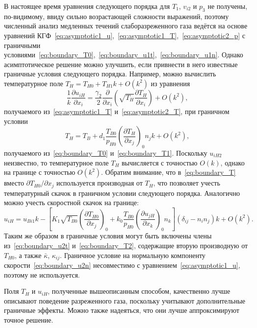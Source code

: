 \documentclass[
aps,%
12pt,%
final,%
notitlepage,%
oneside,%
onecolumn,%
nobibnotes,%
nofootinbib,%
superscriptaddress,%
noshowpacs,%
showkeys,%
centertags]%
{revtex4}
\newcommand{\pder}[2][]{\frac{\partial#1}{\partial#2}}
\newcommand{\Pder}[2][]{\partial#1/\partial#2}
\newcommand{\OO}[1]{O(#1)}
\newcommand{\onwall}[1]{\left(#1\right)_0}
\begin{document}
В настоящее время уравнения следующего порядка для \(T_1\), \(v_{i2}\) и \(p_3\)
не получены, по-видимому, ввиду сильно возрастающей сложности выражений,
поэтому численный анализ медленных течений слаборазреженного газа ведётся
на основе уравнений КГФ~\eqref{eq:asymptotic1_u},~\eqref{eq:asymptotic1_T},~\eqref{eq:asymptotic2_p}
с граничными условиями~\eqref{eq:boundary_T0},~\eqref{eq:boundary_u1t},~\eqref{eq:boundary_u1n}.
Однако асимптотическое решение можно улучшить,
если привнести в него известные граничные условия следующего порядка.
Например, можно вычислить температурное поле \(T_H = T_{H0} + T_{H1}k + \OO{k^2}\) из уравнения
\begin{equation}\label{eq:asymptotic_T}
    \frac1k\pder[u_{iH}]{x_i} = \frac{\gamma_2}2\pder{x_i}\left(\sqrt{T_H}\pder[T_H]{x_i}\right) + \OO{k^2},
\end{equation}
получаемого из~\eqref{eq:asymptotic1_T} и~\eqref{eq:asymptotic2_T},
при граничном условии
\begin{equation}\label{eq:boundary_T}
    T_H = T_B + d_1\frac{T_{B0}}{p_{H0}}\onwall{\pder[T_H]{x_j}}n_j k + \OO{k^2},
\end{equation}
получаемого из~\eqref{eq:boundary_T0} и~\eqref{eq:boundary_T1}.
Поскольку \(u_{iH2}\) неизвестно, то температурное поле \(T_H\) вычисляется с точностью \(\OO{k}\),
однако на границе с точностью \(\OO{k^2}\).
Обратим внимание, что в~\eqref{eq:boundary_T} вместо \(\Pder[T_{H0}]{x_j}\) используется производная от \(T_H\),
что позволяет учесть температурный скачок в граничном условии следующего порядка.
Аналогично можно учесть скоростной скачок на границе:
\begin{equation}\label{eq:boundary_u}
    u_{iH} = u_{Bi1}k - \left[ K_1\sqrt{T_{B0}}\onwall{\pder[T_{H0}]{x_j}}
        + k_0\frac{T_{B0}}{p_{H0}}\onwall{\pder[u_{jH}]{x_k}}n_k \right] (\delta_{ij}-n_i n_j)k + \OO{k^2}.
\end{equation}
Таким же образом в граничные условия могут быть включены члены из~\eqref{eq:boundary_u2t} и~\eqref{eq:boundary_T2},
содержащие вторую производную от \(T_{H0}\), а также \(\bar\kappa\), \(\kappa_{ij}\).
Граничное условие на нормальную компоненту скорости~\eqref{eq:boundary_u2n}
несовместимо с уравнением~\eqref{eq:asymptotic1_u}, поэтому не используется.

Поля \(T_H\) и \(u_{iH}\), полученные вышеописанным способом,
качественно лучше описывают поведение разреженного газа,
поскольку учитывают дополнительные граничные эффекты.
Можно также надеяться, что они лучше аппроксимируют точное решение.
\end{document}
